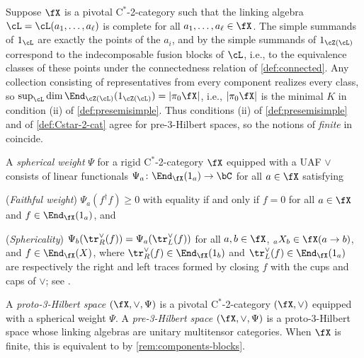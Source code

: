 \documentclass[12pt,reqno]{amsart}
\newcommand{\Cstar}{\ensuremath{\mathrm{C}^{*}}}
\newcommand{\defn}[1]{\emph{#1}}
\begin{document}
\begin{remark}
  \label{rem:components-blocks}
  Suppose $\fX$ is a pivotal $\Cstar$-2-category such that the linking algebra $\cL=\cL(a_1,\dots,a_\ell)$ is complete for all $a_1,\dots,a_\ell\in\fX$. The simple summands of $1_\cL$ are exactly the points of the $a_i$, and by \cite[Rmk. 2.27]{3Hilb} the simple summands of $1_{\cZ(\cL)}$ correspond to the indecomposable fusion blocks of $\cL$, i.e., to the equivalence classes of these points under the connectedness relation of \cref{def:connected}. Any collection consisting of representatives from every component realizes every class, so $\sup_\cL\dim\End_{\cZ(\cL)}(1_{\cZ(\cL)})=|\pi_0\fX|$, i.e., $|\pi_0\fX|$ is the minimal $K$ in condition (ii) of \cref{def:presemisimple}. Thus conditions (ii) of \cref{def:presemisimple} and of \cref{def:Cstar-2-cat} agree for pre-3-Hilbert spaces, so the notions of \emph{finite} in \cite[Defns. 2.26 and 4.3]{3Hilb} coincide.
\end{remark}

\begin{definition}
  A \defn{spherical weight} $\Psi$ for a rigid $\Cstar$-2-category $\fX$ equipped with a UAF $\vee$ consists of linear functionals $\Psi_{a}\colon \End_\fX(1_{a})\to\bC$ for all $a\in \fX$ satisfying
  \begin{lst}
    \item[(i)] (\emph{Faithful weight}) $\Psi_a(f^\dag f)\geq 0$ with equality if and only if $f=0$ for all $a\in\fX$ and $f\in\End_\fX(1_a)$, and
    \item[(ii)] (\emph{Sphericality}) $\Psi_b(\tr^\vee_R(f)) = \Psi_a(\tr^\vee_L(f))$ for all $a,b\in\fX$, ${}_aX_b\in\fX(a\to b)$, and $f\in\End_\fX(X)$, where $\tr^\vee_R(f)\in\End_\fX(1_b)$ and $\tr^\vee_L(f)\in\End_\fX(1_a)$ are respectively the right and left traces formed by closing $f$ with the cups and caps of $\vee$; see \cite[Rmk. 2.19]{3Hilb}.
  \end{lst}
\end{definition}

\begin{definition}
  \label{def:3hilb-spaces}
  A \defn{proto-3-Hilbert space} $(\fX,\vee,\Psi)$ is a pivotal $\Cstar$-2-category $(\fX,\vee)$ equipped with a spherical weight $\Psi$. 
  A \defn{pre-3-Hilbert space} $(\fX,\vee,\Psi)$ is a proto-3-Hilbert space whose linking algebras are unitary multitensor categories. When $\fX$ is finite, this is equivalent to \cite[Defn. 4.3]{3Hilb} by \cref{rem:components-blocks}.
\end{definition}
\end{document}
